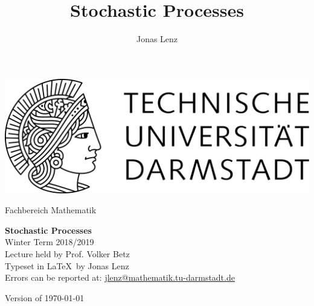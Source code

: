 \documentclass{scrbook}
\title{Stochastic Processes}
\author{Jonas Lenz}
\begin{document}
\frontmatter
{}
\begin{titlepage}
  \begin{center}
    \vspace{1cm}
    \includegraphics[width=0.5\linewidth]{TU_Darmstadt_Logo}
    \vspace{1cm}
    
    \large{Fachbereich Mathematik}
    \vspace{3.5cm}
    
    \Huge{\textbf{Stochastic Processes}\\}
    \vspace*{0.5cm}    
    \Large{{Winter Term 2018/2019}\\}
    \vspace*{0.5cm}    
    \small{Lecture held by Prof. Volker Betz\\}
    \vspace*{1.0cm}
    \small{Typeset in \LaTeX\ by Jonas Lenz\\}
    \small{Errors can be reported at: \href{mailto:jlenz@mathematik.tu-darmstadt.de}{jlenz@mathematik.tu-darmstadt.de}}

    \vspace*{\fill}
    \small{Version of \today}
  \end{center}
\end{titlepage}

\cleardoublepage
\tableofcontents



\mainmatter
{}

\cleardoublepage

%
%
%
%

\backmatter
\clearpage
{}
\printindex
\end{document}
